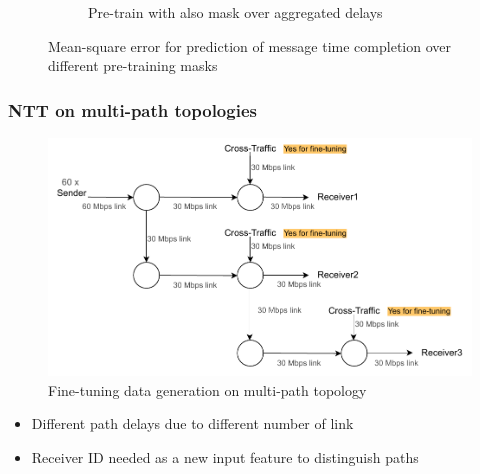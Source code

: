 \documentclass{beamer}
\begin{document}
\begin{frame}
\begin{figure}[h]
\begin{subfigure}[h]{0.5\textwidth}
        \caption{Pre-train with also mask over aggregated delays}
    \end{subfigure}
    \caption{Mean-square error for prediction of message
time completion over different pre-training masks}
    \label{fig:mct_mask}
\end{figure}
\end{frame}

\begin{frame}
\frametitle{NTT on multi-path topologies}


\begin{figure}[h]
  \begin{center}
    \includegraphics[scale=0.55]{figures/complex_topo.pdf}
    \caption{Fine-tuning data generation on multi-path topology}
    \label{fig:topo_ft_big}
  \end{center}
\end{figure}

\pause 

\begin{itemize}
    \item<1-> Different path delays due to different number of link 
    \item<1-> Receiver ID needed as a new input feature to distinguish paths
\end{itemize}

\end{frame}
\end{document}
